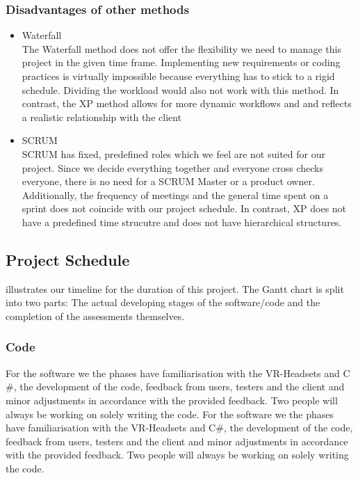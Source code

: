 \documentclass[coverpage,lineno]{../custom}
\begin{document}
\subsubsection{Disadvantages of other methods}
\begin{itemize}
    \item Waterfall \\
    The Waterfall method does not offer the flexibility we need to manage this project in the given time frame. Implementing new requirements or coding practices is virtually impossible because everything has to stick to a rigid schedule. Dividing the workload would also not work with this method. In contrast, the XP method allows for more dynamic workflows and and reflects a realistic relationship with the client
    \item SCRUM \\
    SCRUM has fixed, predefined roles which we feel are not suited for our project. Since we decide everything together and everyone cross checks everyone, there is no need for a SCRUM Master or a product owner. Additionally, the frequency of meetings and the general time spent on a sprint does not coincide with our project schedule. In contrast, XP does not have a predefined time strucutre and does not have hierarchical structures.   
    
    
\end{itemize}

\subsection{Project Schedule}
\label{ssec:schedule}

 illustrates our timeline for the duration of this project. The Gantt chart is split into two parts: The actual developing stages of the software/code and the completion of the assessments themselves. 
\subsubsection{Code}
For the software we the phases have familiarisation with the VR-Headsets and C \#, the development of the code, feedback from users, testers and the client and minor adjustments in accordance with the provided feedback. Two people will always be working on solely writing the code. 
For the software we the phases have familiarisation with the VR-Headsets and C\#, the development of the code, feedback from users, testers and the client and minor adjustments in accordance with the provided feedback. Two people will always be working on solely writing the code. 
\end{document}
